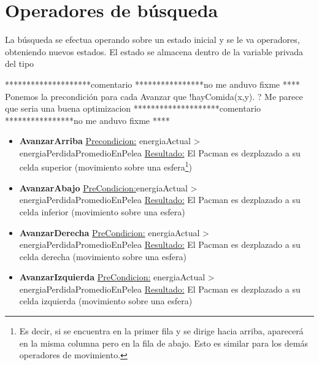 \section{Operadores de búsqueda}

La búsqueda se efectua operando sobre un estado inicial y se le va 
operadores, obteniendo nuevos estados. El estado se almacena dentro de
la variable privada  del tipo 

********************comentario ****************no me anduvo fixme ****
Ponemos la precondición para cada Avanzar que !hayComida(x,y). ?
Me parece que seria una buena optimizacion
********************comentario ****************no me anduvo fixme ****

\begin{itemize}

\item \textbf{AvanzarArriba}\newline
\underline{Precondicion:} energiaActual > energiaPerdidaPromedioEnPelea\newline
\underline{Resultado:} El Pacman es dezplazado a su celda superior (movimiento
sobre una esfera\footnote{Es decir, si se encuentra en la primer fila y se
dirige hacia arriba, aparecerá en la misma columna pero en la fila de abajo.
Esto es similar para los demás operadores de movimiento.})

\item \textbf{AvanzarAbajo}\newline
\underline{PreCondicion:}energiaActual > energiaPerdidaPromedioEnPelea
\underline{Resultado:} El Pacman es dezplazado a su celda inferior (movimiento
sobre una esfera)\newline

\item \textbf{AvanzarDerecha}\newline
\underline{PreCondicion:} energiaActual > energiaPerdidaPromedioEnPelea\newline
\underline{Resultado:} El Pacman es dezplazado a su celda derecha (movimiento
sobre una esfera)\newline

\item \textbf{AvanzarIzquierda}\newline
\underline{PreCondicion:} energiaActual > energiaPerdidaPromedioEnPelea\newline
\underline{Resultado:} El Pacman es dezplazado a su celda izquierda (movimiento
sobre una esfera)\newline


\end{itemize}
